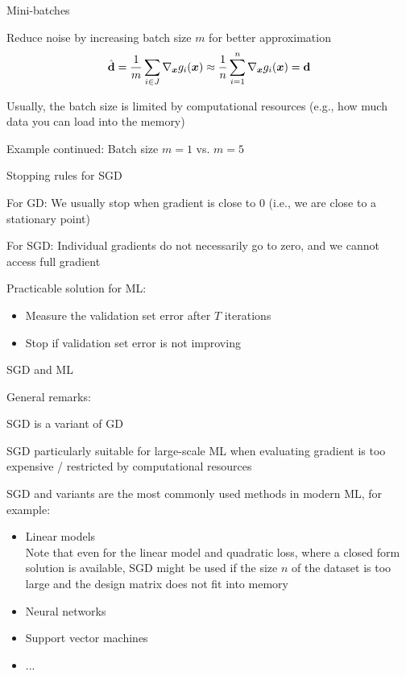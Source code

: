 \documentclass[11pt,compress,t,notes=noshow, xcolor=table]{beamer}
\begin{document}
\begin{framei}{Mini-batches}
\item Reduce noise by increasing batch size $m$ for better approximation
$$
\hat{\mathbf{d}} = \frac{1}{m} \sum_{i \in J} \nabla_{\bm{x}} g_i(\bm{x}) \approx \frac{1}{n} \sum\limits_{i=1}^n \nabla_{\bm{x}} g_i(\bm{x}) = \mathbf{d}
$$
\item Usually, the batch size is limited by computational resources (e.g., how much data you can load into the memory)
\vfill
{}
\vfill
\item Example continued: Batch size $m = 1$ vs. $m = 5$
\end{framei}


\begin{framei}{Stopping rules for SGD}
\item For GD: We usually stop when gradient is close to $0$ (i.e., we are close to a stationary point)
\item For SGD: Individual gradients do not necessarily go to zero, and we cannot access full gradient
\item Practicable solution for ML:
\begin{itemize}
\item Measure the validation set error after $T$ iterations
\item Stop if validation set error is not improving
\end{itemize}
\end{framei}


\begin{framev}[fs=small]{SGD and ML}
\begin{blocki}{General remarks:}
\item SGD is a variant of GD
\item SGD particularly suitable for large-scale ML when evaluating gradient is too expensive / restricted by computational resources
\item SGD and variants are the most commonly used methods in modern ML, for example:
\begin{itemize}
\item Linear models \\
Note that even for the linear model and quadratic loss, where a closed form solution is available, SGD might be used if the size $n$ of the dataset is too large and the design matrix does not fit into memory
\item Neural networks
\item Support vector machines
\item ...
\end{itemize}
\end{blocki}
\end{framev}
\end{document}
